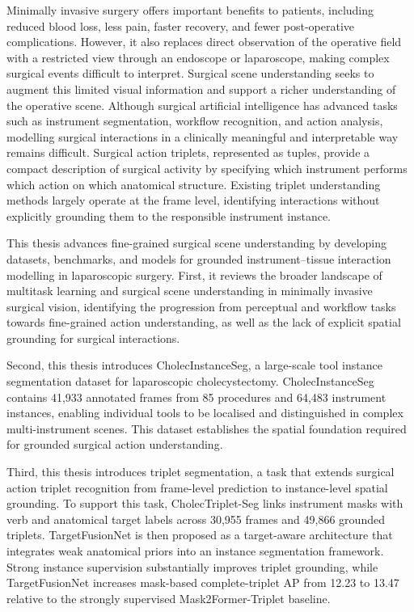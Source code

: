 Minimally invasive surgery offers important benefits to patients, including reduced blood loss, less pain, faster recovery, and fewer post-operative complications. However, it also replaces direct observation of the operative field with a restricted view through an endoscope or laparoscope, making complex surgical events difficult to interpret. Surgical scene understanding seeks to augment this limited visual information and support a richer understanding of the operative scene. Although surgical artificial intelligence has advanced tasks such as instrument segmentation, workflow recognition, and action analysis, modelling surgical interactions in a clinically meaningful and interpretable way remains difficult. Surgical action triplets, represented as \ivttriplet tuples, provide a compact description of surgical activity by specifying which instrument performs which action on which anatomical structure. Existing triplet understanding methods largely operate at the frame level, identifying interactions without explicitly grounding them to the responsible instrument instance.

This thesis advances fine-grained surgical scene understanding by developing datasets, benchmarks, and models for grounded instrument--tissue interaction modelling in laparoscopic surgery. First, it reviews the broader landscape of multitask learning and surgical scene understanding in minimally invasive surgical vision, identifying the progression from perceptual and workflow tasks towards fine-grained action understanding, as well as the lack of explicit spatial grounding for surgical interactions.

Second, this thesis introduces CholecInstanceSeg, a large-scale tool instance segmentation dataset for laparoscopic cholecystectomy. CholecInstanceSeg contains 41,933 annotated frames from 85 procedures and 64,483 instrument instances, enabling individual tools to be localised and distinguished in complex multi-instrument scenes. This dataset establishes the spatial foundation required for grounded surgical action understanding.

Third, this thesis introduces triplet segmentation, a task that extends surgical action triplet recognition from frame-level prediction to instance-level spatial grounding. To support this task, CholecTriplet-Seg links instrument masks with verb and anatomical target labels across 30,955 frames and 49,866 grounded triplets. TargetFusionNet is then proposed as a target-aware architecture that integrates weak anatomical priors into an instance segmentation framework. Strong instance supervision substantially improves triplet grounding, while TargetFusionNet increases mask-based complete-triplet AP from 12.23 to 13.47 relative to the strongly supervised Mask2Former-Triplet baseline.


